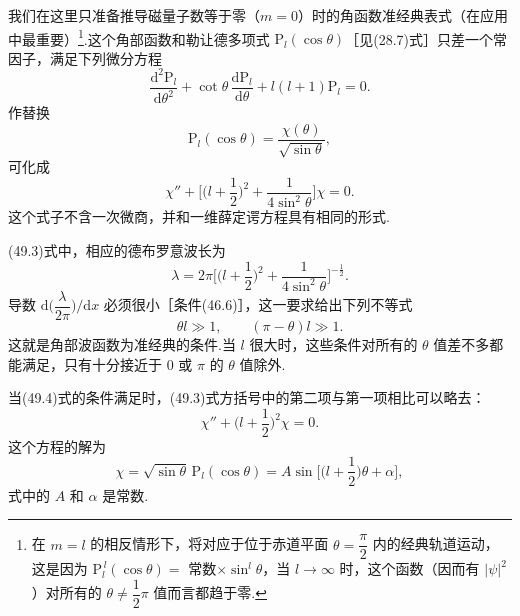 我们在这里只准备推导磁量子数等于零（$m=0$）时的角函数准经典表式（在应用中最重要）\footnote{在 $m=l$ 的相反情形下，将对应于位于赤道平面 $\theta=\dfrac{\pi}{2}$ 内的经典轨道运动，这是因为 $\mathrm{P}_l^{\,l}(\cos\theta)=$ 常数$\times\sin^l\theta$，当 $l\to\infty$ 时，这个函数（因而有 $|\psi|^2$）对所有的 $\theta\neq\dfrac{1}{2}\pi$ 值而言都趋于零.}.这个角部函数和勒让德多项式 $\mathrm{P}_l(\cos\theta)$［见(28.7)式］只差一个常因子，满足下列微分方程
\begin{equation}
  \frac{\mathrm{d}^2\mathrm{P}_l}{\mathrm{d}\theta^2}
  +\cot\theta\,\frac{\mathrm{d}\mathrm{P}_l}{\mathrm{d}\theta}
  +l(l+1)\mathrm{P}_l=0.
\end{equation}
作替换
\begin{equation}
  \mathrm{P}_l(\cos\theta)=\frac{\chi(\theta)}{\sqrt{\sin\theta}},
\end{equation}
可化成
\begin{equation}
  \chi''+\bigg[\bigg(l+\frac{1}{2}\bigg)^2+\frac{1}{4\sin^2\theta}\bigg]\chi=0.
\end{equation}
这个式子不含一次微商，并和一维薛定谔方程具有相同的形式.

(49.3)式中，相应的德布罗意波长为
\begin{equation*}
  \lambda=2\pi\bigg[\bigg(l+\frac{1}{2}\bigg)^2
  +\frac{1}{4\sin^2\theta}\bigg]^{-\frac{1}{2}}.
\end{equation*}
导数 $\mathrm{d}\Big(\dfrac{\lambda}{2\pi}\Big)\big/\mathrm{d}x$ 必须很小［条件(46.6)］，这一要求给出下列不等式
\begin{equation}
  \theta l\gg1,\qquad(\pi-\theta)l\gg1.
\end{equation}
这就是角部波函数为准经典的条件.当 $l$ 很大时，这些条件对所有的 $\theta$ 值差不多都能满足，只有十分接近于 0 或 $\pi$ 的 $\theta$ 值除外.

当(49.4)式的条件满足时，(49.3)式方括号中的第二项与第一项相比可以略去：
\begin{equation*}
  \chi''+\bigg(l+\frac{1}{2}\bigg)^2\chi=0.
\end{equation*}
这个方程的解为
\begin{equation}
  \chi=\sqrt{\sin\theta}\,\mathrm{P}_l(\cos\theta)
  =A\sin\bigg[\bigg(l+\frac{1}{2}\bigg)\theta+\alpha\bigg],
\end{equation}
式中的 $A$ 和 $\alpha$ 是常数.

